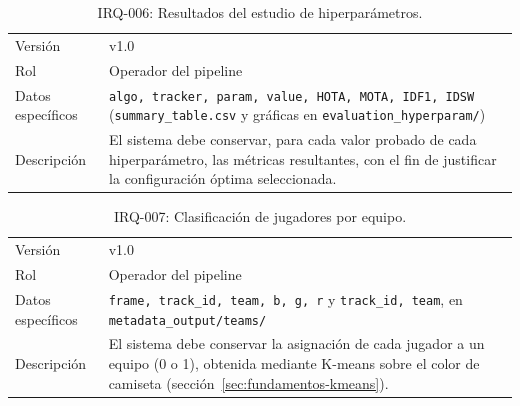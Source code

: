 \begin{table}[htp]
\centering
\caption{IRQ-006: Resultados del estudio de hiperparámetros.}
\label{tab:irq-006}
\renewcommand{\arraystretch}{1.2}
\begin{tabular}{|p{3.1cm}|p{9.2cm}|}
\hline
\rowcolor{gray!25}
\multicolumn{2}{|l|}{\textbf{IRQ-006 -- Resultados del estudio de hiperparámetros}} \\
\hline
Versión & v1.0 \\
\hline
Rol & Operador del pipeline \\
\hline
Datos específicos & \texttt{algo, tracker, param, value, HOTA, MOTA, IDF1,
  IDSW} (\texttt{summary\_table.csv} y gráficas en
  \texttt{evaluation\_hyperparam/}) \\
\hline
Descripción & El sistema debe conservar, para cada valor probado de cada
  hiperparámetro, las métricas resultantes, con el fin de justificar la
  configuración óptima seleccionada. \\
\hline
\end{tabular}
\end{table}

\begin{table}[htp]
\centering
\caption{IRQ-007: Clasificación de jugadores por equipo.}
\label{tab:irq-007}
\renewcommand{\arraystretch}{1.2}
\begin{tabular}{|p{3.1cm}|p{9.2cm}|}
\hline
\rowcolor{gray!25}
\multicolumn{2}{|l|}{\textbf{IRQ-007 -- Clasificación de jugadores por equipo}} \\
\hline
Versión & v1.0 \\
\hline
Rol & Operador del pipeline \\
\hline
Datos específicos & \texttt{frame, track\_id, team, b, g, r} y
  \texttt{track\_id, team}, en
  \texttt{metadata\_output/teams/} \\
\hline
Descripción & El sistema debe conservar la asignación de cada jugador a un
  equipo (0 o 1), obtenida mediante K-means sobre el color de camiseta
  (sección~\ref{sec:fundamentos-kmeans}). \\
\hline
\end{tabular}
\end{table}

